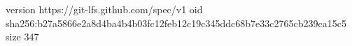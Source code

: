 version https://git-lfs.github.com/spec/v1
oid sha256:b27a5866e2a8d4ba4b4b03fc12feb12c19c345ddc68b7e33c2765cb239ca15c5
size 347
